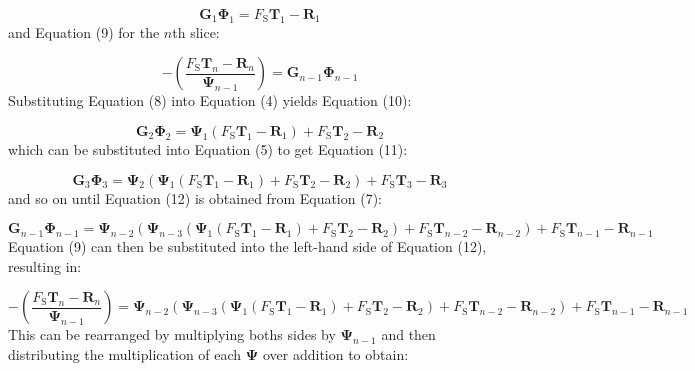 \documentclass[12pt]{article}
\begin{document}
\begin{displaymath}
{\mathbf{G}}_{1} {\mathbf{Φ}}_{1}={F_{\text{S}}} {\mathbf{T}}_{1}-{\mathbf{R}}_{1}
\end{displaymath}
and Equation (9) for the $n$th slice:

\begin{displaymath}
-\left(\frac{{F_{\text{S}}} {\mathbf{T}}_{n}-{\mathbf{R}}_{n}}{{\mathbf{Ψ}}_{n-1}}\right)={\mathbf{G}}_{n-1} {\mathbf{Φ}}_{n-1}
\end{displaymath}
Substituting Equation (8) into Equation (4) yields Equation (10):

\begin{displaymath}
{\mathbf{G}}_{2} {\mathbf{Φ}}_{2}={\mathbf{Ψ}}_{1} \left({F_{\text{S}}} {\mathbf{T}}_{1}-{\mathbf{R}}_{1}\right)+{F_{\text{S}}} {\mathbf{T}}_{2}-{\mathbf{R}}_{2}
\end{displaymath}
which can be substituted into Equation (5) to get Equation (11):

\begin{displaymath}
{\mathbf{G}}_{3} {\mathbf{Φ}}_{3}={\mathbf{Ψ}}_{2} \left({\mathbf{Ψ}}_{1} \left({F_{\text{S}}} {\mathbf{T}}_{1}-{\mathbf{R}}_{1}\right)+{F_{\text{S}}} {\mathbf{T}}_{2}-{\mathbf{R}}_{2}\right)+{F_{\text{S}}} {\mathbf{T}}_{3}-{\mathbf{R}}_{3}
\end{displaymath}
and so on until Equation (12) is obtained from Equation (7):

\begin{displaymath}
{\mathbf{G}}_{n-1} {\mathbf{Φ}}_{n-1}={\mathbf{Ψ}}_{n-2} \left({\mathbf{Ψ}}_{n-3} \left({\mathbf{Ψ}}_{1} \left({F_{\text{S}}} {\mathbf{T}}_{1}-{\mathbf{R}}_{1}\right)+{F_{\text{S}}} {\mathbf{T}}_{2}-{\mathbf{R}}_{2}\right)+{F_{\text{S}}} {\mathbf{T}}_{n-2}-{\mathbf{R}}_{n-2}\right)+{F_{\text{S}}} {\mathbf{T}}_{n-1}-{\mathbf{R}}_{n-1}
\end{displaymath}
Equation (9) can then be substituted into the left-hand side of Equation (12), resulting in:

\begin{displaymath}
-\left(\frac{{F_{\text{S}}} {\mathbf{T}}_{n}-{\mathbf{R}}_{n}}{{\mathbf{Ψ}}_{n-1}}\right)={\mathbf{Ψ}}_{n-2} \left({\mathbf{Ψ}}_{n-3} \left({\mathbf{Ψ}}_{1} \left({F_{\text{S}}} {\mathbf{T}}_{1}-{\mathbf{R}}_{1}\right)+{F_{\text{S}}} {\mathbf{T}}_{2}-{\mathbf{R}}_{2}\right)+{F_{\text{S}}} {\mathbf{T}}_{n-2}-{\mathbf{R}}_{n-2}\right)+{F_{\text{S}}} {\mathbf{T}}_{n-1}-{\mathbf{R}}_{n-1}
\end{displaymath}
This can be rearranged by multiplying boths sides by ${\mathbf{Ψ}}_{n-1}$ and then distributing the multiplication of each $\mathbf{Ψ}$ over addition to obtain:
\end{document}
